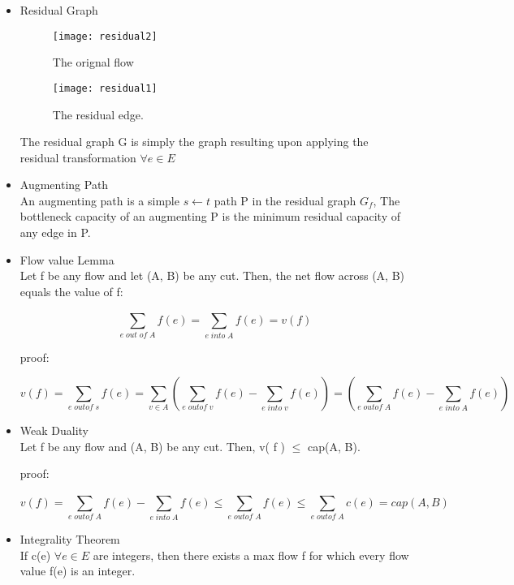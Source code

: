 \begin{itemize}

    \item{Residual Graph}

          \begin{figure}[H]
              \centering
              \texttt{[image: residual2]}
              \caption{The orignal flow}
          \end{figure}

          \begin{figure}[H]
              \centering
              \texttt{[image: residual1]}
              \caption{The residual edge.}
          \end{figure}

          The residual graph G is simply the graph resulting upon applying the residual transformation $\forall e \in E$

    \item{Augmenting Path}\\
          An augmenting path is a simple $s \leftarrow t$ path P in the residual graph $G_{f}$, The bottleneck capacity of an augmenting P is the minimum residual capacity of any edge in P.

    \item {Flow value Lemma}\\
          Let f be any flow and let (A, B) be any cut. Then, the net flow across (A, B) equals the value of f:

          \[ \sum_{e \; out \; of \; A}^{} f(e) = \sum_{e \; into \; A}^{} f(e) = v(f)\]

          proof:

          \[v(f) = \sum_{e \; outof  \; s}^{} f(e) =  \sum_{v \in A}^{} ( \sum_{e \; out of  \; v}^{} f(e) - \sum_{e \; into  \; v}^{} f(e)) =  ( \sum_{e \; out of  \; A}^{} f(e) - \sum_{e \; into  \; A}^{} f(e))\]

    \item {Weak Duality}\\
          Let f be any flow and (A, B) be any cut. Then, v( f ) $\leq$ cap(A, B).

          proof:

          \[v(f) =  \sum_{e \; out of  \; A}^{} f(e) - \sum_{e \; into  \; A}^{} f(e) \leq  \sum_{e \; out of  \; A}^{} f(e) \leq \sum_{e \; out of  \; A}^{} c(e) = cap(A,B)\]

    \item {Integrality Theorem}\\
          If c(e) $\forall e \in E$ are integers, then there exists a max flow f for which every flow value f(e) is an integer.

\end{itemize}


